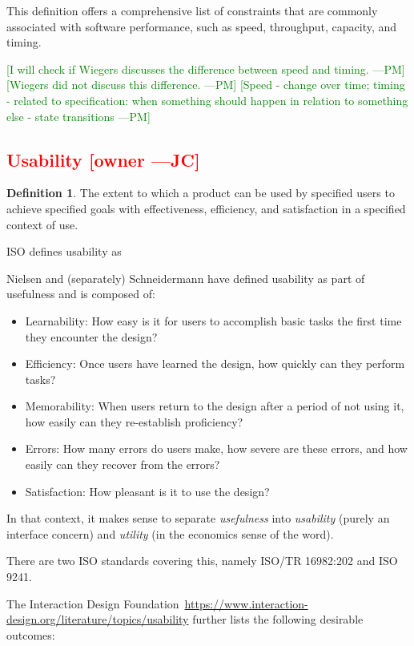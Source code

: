 \documentclass[letterpaper,cleveref]{lipics-v2019}
\newcommand{\authornote}[3]{\textcolor{#1}{[#3 ---#2]}}
\newcommand{\authornote}[3]{}
\newcommand{\jc}[1]{\authornote{red}{JC}{#1}} %
\newcommand{\pmi}[1]{\authornote{green}{PM}{#1}} %
\newcommand{\notdone}[1]{\textcolor{red}{#1}}
\theoremstyle{definition}
\newtheorem{defn}{Definition}
\begin{document}
This definition offers a comprehensive list of constraints that are commonly
associated with software performance, such as speed, throughput, capacity, and
timing.

\pmi{I will check if Wiegers discusses the difference between speed and timing.}
\pmi{Wiegers did not discuss this difference.}
\pmi{Speed - change over time; timing - related to specification: when something
	should happen in relation to something else - state transitions}

\subsection{\notdone{Usability} \jc{owner}} 

\begin{defn}
	The extent to which a product can be used by specified users to achieve
	specified goals with effectiveness, efficiency, and satisfaction in a specified
	context of use.
\end{defn}
ISO defines usability as

Nielsen and (separately) Schneidermann have defined usability as part of
usefulness and
is composed of:
\begin{itemize}
	\item Learnability: How easy is it for users to accomplish basic tasks the
	first time they encounter the design?
	\item Efficiency: Once users have learned the design, how quickly can they
	perform tasks?
	\item Memorability: When users return to the design after a period of not using
	it, how easily can they re-establish proficiency?
	\item Errors: How many errors do users make, how severe are these errors, and
	how easily can they recover from the errors?
	\item Satisfaction: How pleasant is it to use the design?
\end{itemize}
In that context, it makes sense to separate \emph{usefulness} into
\emph{usability} (purely an interface concern) and \emph{utility} (in the
economics
sense of the word).

There are two ISO standards covering this, namely ISO/TR 16982:202 and ISO 9241.


The Interaction Design
Foundation~\url{https://www.interaction-design.org/literature/topics/usability}
further lists the following desirable outcomes:
\end{document}
